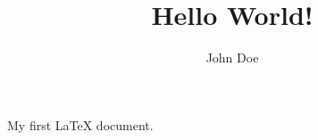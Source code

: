 \documentclass{article}
\title{Hello World!}
\author{John Doe}
\begin{document}
	\maketitle
	
	My first \LaTeX{} document.
\end{document}

